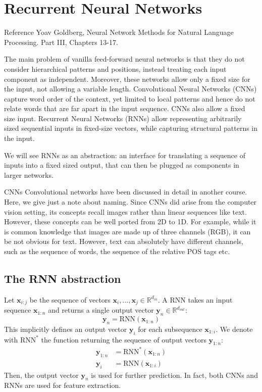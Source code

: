 \chapter{Recurrent Neural Networks}

\begin{note}{Reference}
    Yoav Goldberg, Neural Network Methods for Natural Language Processing.\cite{goldberg2017neural}
    Part III, Chapters 13-17.
\end{note}

The main problem of vanilla feed-forward neural networks is that they do not consider hierarchical patterns and positions, instead treating each input component as independent. Moreover, these networks allow only a fixed size for the input, not allowing a variable length. Convolutional Neural Networks (CNNs) capture word order of the context, yet limited to local patterns and hence do not relate words that are far apart in the input sequence. CNNs also allow a fixed size input. Recurrent Neural Networks (RNNs) allow representing arbitrarily sized sequential inputs in fixed-size vectors, while capturing structural patterns in the input.

We will see RNNs as an abstraction: an interface for translating a sequence of inputs into a fixed sized output, that can then be plugged as components in larger networks.

\begin{note}{CNNs}
    Convolutional networks have been discussed in detail in another course. Here, we give just a note about naming. Since CNNs did arise from the computer vision setting, its concepts recall images rather than linear sequences like text. However, these concepts can be well ported from 2D to 1D. For example, while it is common knowledge that images are made up of three channels (RGB), it can be not obvious for text. However, text can absolutely have different channels, such as the sequence of words, the sequence of the relative POS tags etc.
\end{note}

\section{The RNN abstraction}
Let $\mathbf{x}_{i:j}$ be the sequence of vectors $\mathbf{x}_{i},\dots,\mathbf{x}_{j} \in \mathbb{R}^{d_{in}}$. A RNN takes an input sequence $\mathbf{x}_{1:n}$ and returns a single output vector $\mathbf{y}_{n}\in \mathbb{R}^{d_{out}}$:
\[
\mathbf{y}_{n}=\text{RNN}(\mathbf{x}_{1:n})
\]
This implicitly defines an output vector $\mathbf{y}_{i}$ for each subsequence $\mathbf{x}_{1:i}$. We denote with $\text{RNN}^{*}$ the function returning the sequence of output vectors $\mathbf{y}_{1:n}$:
\[
\begin{aligned}
\mathbf{y}_{1:n}&=\text{RNN}^{*}(\mathbf{x}_{1:n}) \\
\mathbf{y}_{i}&=\text{RNN}(\mathbf{x}_{1:i})
\end{aligned}
\]
Then, the output vector $\mathbf{y}_{n}$ is used for further prediction. In fact, both CNNs and RNNs are used for feature extraction.

